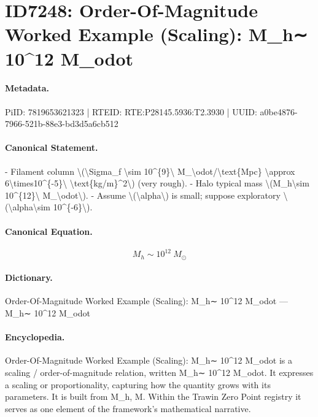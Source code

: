 \section*{ID7248: Order-Of-Magnitude Worked Example (Scaling): M\_h∼ 10\textasciicircum{}12 M\_odot}
\paragraph{Metadata.}
PiID: 7819653621323 | RTEID: RTE:P28145.5936:T2.3930 | UUID: a0be4876-7966-521b-88e3-bd3d5a6cb512

\paragraph{Canonical Statement.}
- Filament column \textbackslash{}(\textbackslash{}Sigma\_f \textbackslash{}sim 10\textasciicircum{}\{9\}\textbackslash{} M\_\textbackslash{}odot/\textbackslash{}text\{Mpc\} \textbackslash{}approx 6\textbackslash{}times10\textasciicircum{}\{-5\}\textbackslash{} \textbackslash{}text\{kg/m\}\textasciicircum{}2\textbackslash{}) (very rough). - Halo typical mass \textbackslash{}(M\_h\textbackslash{}sim 10\textasciicircum{}\{12\}\textbackslash{} M\_\textbackslash{}odot\textbackslash{}). - Assume \textbackslash{}(\textbackslash{}alpha\textbackslash{}) is small; suppose exploratory \textbackslash{}(\textbackslash{}alpha\textbackslash{}sim 10\textasciicircum{}\{-6\}\textbackslash{}).

\paragraph{Canonical Equation.}
\[
M_h\sim 10^{12}\ M_\odot
\]

\paragraph{Dictionary.}
Order-Of-Magnitude Worked Example (Scaling): M\_h∼ 10\textasciicircum{}12 M\_odot — M\_h∼ 10\textasciicircum{}12 M\_odot

\paragraph{Encyclopedia.}
Order-Of-Magnitude Worked Example (Scaling): M\_h∼ 10\textasciicircum{}12 M\_odot is a scaling / order-of-magnitude relation, written M\_h∼ 10\textasciicircum{}12 M\_odot. It expresses a scaling or proportionality, capturing how the quantity grows with its parameters. It is built from M\_h, M. Within the Trawin Zero Point registry it serves as one element of the framework's mathematical narrative.
